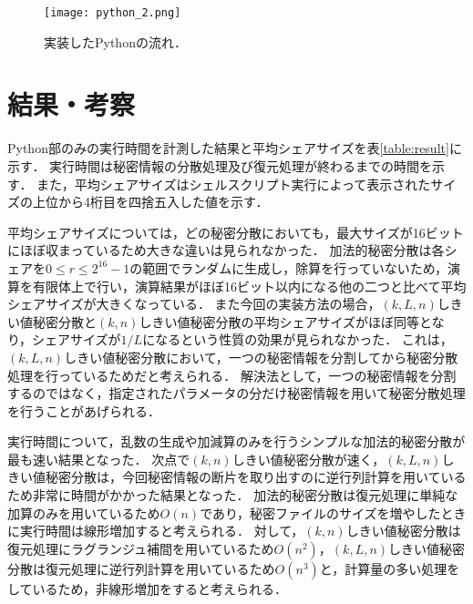 \documentclass[10pt, a4paper, titlepage]{jsreport}
\begin{document}
	\begin{figure}[ht]
		\begin{center}
			\texttt{[image: python\_2.png]}
			\caption{実装したPythonの流れ．}
			\label{python}
		\end{center}
	\end{figure}

	\chapter{結果・考察}
	Python部のみの実行時間を計測した結果と平均シェアサイズを表\ref{table:result}に示す．
	実行時間は秘密情報の分散処理及び復元処理が終わるまでの時間を示す．
	また，平均シェアサイズはシェルスクリプト実行によって表示されたサイズの上位から4桁目を四捨五入した値を示す．

	\begin{table}[ht]
		\begin{center}
			\caption{実行時間及びシェアの平均サイズ．}
			\label{table:result}
		\end{center}
	\end{table}

	平均シェアサイズについては，どの秘密分散においても，最大サイズが16ビットにほぼ収まっているため大きな違いは見られなかった．
	加法的秘密分散は各シェアを$0{\leq}r{\leq}2^{16}-1$の範囲でランダムに生成し，除算を行っていないため，演算を有限体上で行い，演算結果がほぼ16ビット以内になる他の二つと比べて平均シェアサイズが大きくなっている．
	また今回の実装方法の場合，$(k,L,n)$しきい値秘密分散と$(k,n)$しきい値秘密分散の平均シェアサイズがほぼ同等となり，シェアサイズが$1/L$になるという性質の効果が見られなかった．
	これは，$(k,L,n)$しきい値秘密分散において，一つの秘密情報を分割してから秘密分散処理を行っているためだと考えられる．
	解決法として，一つの秘密情報を分割するのではなく，指定されたパラメータの分だけ秘密情報を用いて秘密分散処理を行うことがあげられる．

	実行時間について，乱数の生成や加減算のみを行うシンプルな加法的秘密分散が最も速い結果となった．
	次点で$(k,n)$しきい値秘密分散が速く，$(k,L,n)$しきい値秘密分散は，今回秘密情報の断片を取り出すのに逆行列計算を用いているため非常に時間がかかった結果となった．
	加法的秘密分散は復元処理に単純な加算のみを用いているため$O(n)$であり，秘密ファイルのサイズを増やしたときに実行時間は線形増加すると考えられる．
	対して，$(k,n)$しきい値秘密分散は復元処理にラグランジュ補間を用いているため$O(n^{2})$，$(k,L,n)$しきい値秘密分散は復元処理に逆行列計算を用いているため$O(n^{3})$と，計算量の多い処理をしているため，非線形増加をすると考えられる．
\end{document}

